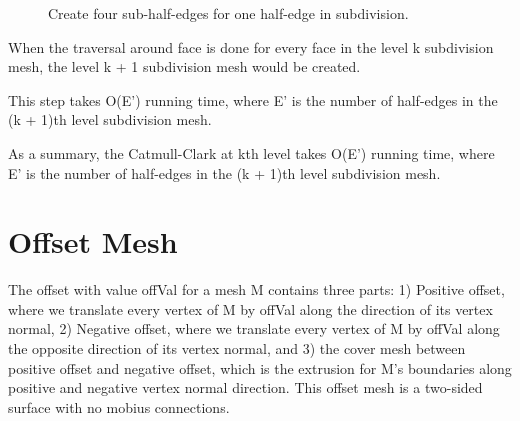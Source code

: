 \documentclass[12pt]{article}
\begin{document}
\begin{figure}[ht]
  \centering
  \caption{Create four sub-half-edges for one half-edge in subdivision.}
  \label{figure:compileNewMesh}
\end{figure}

When the traversal around face is done for every face in the level k subdivision mesh, the level k + 1 subdivision mesh would be created.

This step takes O(E') running time, where E' is the number of half-edges in the (k + 1)th level subdivision mesh.

As a summary, the Catmull-Clark at kth level takes O(E') running time, where E' is the number of half-edges in the (k + 1)th level subdivision mesh.

\newpage
\section{Offset Mesh} \label{sec:offset}

The offset with value offVal for a mesh M contains three parts: 1) Positive offset, where we translate every vertex of M by offVal along the direction of its vertex normal, 2) Negative offset, where we translate every vertex of M by offVal along the opposite direction of its vertex normal, and 3) the cover mesh between positive offset and negative offset, which is the extrusion for M's boundaries along positive and negative vertex normal direction. This offset mesh is a two-sided surface with no mobius connections.
\end{document}
